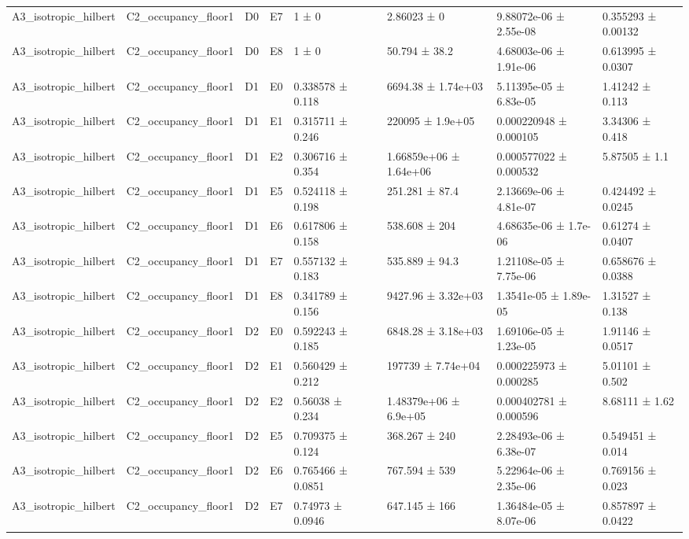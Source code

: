 \begin{table}
\begin{tabular}{lllllllll}
A3\_isotropic\_hilbert & C2\_occupancy\_floor1 & D0 & E7 & 1 ± 0 &  & 2.86023 ± 0 & 9.88072e-06 ± 2.55e-08 & 0.355293 ± 0.00132 \\
A3\_isotropic\_hilbert & C2\_occupancy\_floor1 & D0 & E8 & 1 ± 0 &  & 50.794 ± 38.2 & 4.68003e-06 ± 1.91e-06 & 0.613995 ± 0.0307 \\
A3\_isotropic\_hilbert & C2\_occupancy\_floor1 & D1 & E0 & 0.338578 ± 0.118 &  & 6694.38 ± 1.74e+03 & 5.11395e-05 ± 6.83e-05 & 1.41242 ± 0.113 \\
A3\_isotropic\_hilbert & C2\_occupancy\_floor1 & D1 & E1 & 0.315711 ± 0.246 &  & 220095 ± 1.9e+05 & 0.000220948 ± 0.000105 & 3.34306 ± 0.418 \\
A3\_isotropic\_hilbert & C2\_occupancy\_floor1 & D1 & E2 & 0.306716 ± 0.354 &  & 1.66859e+06 ± 1.64e+06 & 0.000577022 ± 0.000532 & 5.87505 ± 1.1 \\
A3\_isotropic\_hilbert & C2\_occupancy\_floor1 & D1 & E5 & 0.524118 ± 0.198 &  & 251.281 ± 87.4 & 2.13669e-06 ± 4.81e-07 & 0.424492 ± 0.0245 \\
A3\_isotropic\_hilbert & C2\_occupancy\_floor1 & D1 & E6 & 0.617806 ± 0.158 &  & 538.608 ± 204 & 4.68635e-06 ± 1.7e-06 & 0.61274 ± 0.0407 \\
A3\_isotropic\_hilbert & C2\_occupancy\_floor1 & D1 & E7 & 0.557132 ± 0.183 &  & 535.889 ± 94.3 & 1.21108e-05 ± 7.75e-06 & 0.658676 ± 0.0388 \\
A3\_isotropic\_hilbert & C2\_occupancy\_floor1 & D1 & E8 & 0.341789 ± 0.156 &  & 9427.96 ± 3.32e+03 & 1.3541e-05 ± 1.89e-05 & 1.31527 ± 0.138 \\
A3\_isotropic\_hilbert & C2\_occupancy\_floor1 & D2 & E0 & 0.592243 ± 0.185 &  & 6848.28 ± 3.18e+03 & 1.69106e-05 ± 1.23e-05 & 1.91146 ± 0.0517 \\
A3\_isotropic\_hilbert & C2\_occupancy\_floor1 & D2 & E1 & 0.560429 ± 0.212 &  & 197739 ± 7.74e+04 & 0.000225973 ± 0.000285 & 5.01101 ± 0.502 \\
A3\_isotropic\_hilbert & C2\_occupancy\_floor1 & D2 & E2 & 0.56038 ± 0.234 &  & 1.48379e+06 ± 6.9e+05 & 0.000402781 ± 0.000596 & 8.68111 ± 1.62 \\
A3\_isotropic\_hilbert & C2\_occupancy\_floor1 & D2 & E5 & 0.709375 ± 0.124 &  & 368.267 ± 240 & 2.28493e-06 ± 6.38e-07 & 0.549451 ± 0.014 \\
A3\_isotropic\_hilbert & C2\_occupancy\_floor1 & D2 & E6 & 0.765466 ± 0.0851 &  & 767.594 ± 539 & 5.22964e-06 ± 2.35e-06 & 0.769156 ± 0.023 \\
A3\_isotropic\_hilbert & C2\_occupancy\_floor1 & D2 & E7 & 0.74973 ± 0.0946 &  & 647.145 ± 166 & 1.36484e-05 ± 8.07e-06 & 0.857897 ± 0.0422 \\

\end{tabular}
\end{table}

